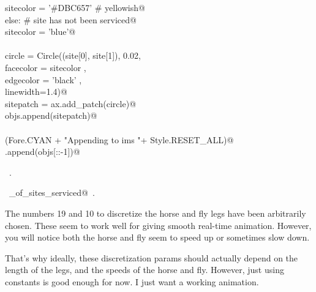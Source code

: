 \documentclass[11.5pt]{report}
\begin{document}
\begin{flushleft}
\begin{list}{}{}
\mbox{}\verb@        sitecolor = '#DBC657' # yellowish@\\
\mbox{}\verb@    else:                                  # site has not been serviced@\\
\mbox{}\verb@        sitecolor = 'blue'@\\
\mbox{}\verb@@\\
\mbox{}\verb@    circle = Circle((site[0], site[1]), 0.02, \@\\
\mbox{}\verb@                    facecolor = sitecolor   , \@\\
\mbox{}\verb@                    edgecolor = 'black'     , \@\\
\mbox{}\verb@                    linewidth=1.4)@\\
\mbox{}\verb@    sitepatch = ax.add_patch(circle)@\\
\mbox{}\verb@    objs.append(sitepatch)@\\
\mbox{}\verb@@\\
\mbox{}\verb@debug(Fore.CYAN + "Appending to ims "+ Style.RESET_ALL)@\\
\mbox{}\verb@ims.append(objs[::-1])@\\
\mbox{}\verb@@{\NWsep}
\end{list}
\vspace{-1.5ex}
\footnotesize
\begin{list}{}{\setlength{\itemsep}{-\parsep}\setlength{\itemindent}{-\leftmargin}}
\item \NWtxtMacroRefIn\ .
\item \NWtxtIdentsUsed\nobreak\  \verb@number_of_sites_serviced@\nobreak\ .
\item{}
\end{list}
\vspace{4ex}
\end{flushleft}


\vspace{-0.8cm} \newchunk \label{subsec-discretize-leg}
The numbers 19 and 10 to discretize the horse and fly legs have been 
arbitrarily chosen. These seem to work well for giving smooth real-time animation. 
However, you will notice  both the horse and fly seem to speed up or sometimes slow 
down. 

That's why ideally, these discretization params should actually depend on the length of the legs, and 
the speeds of the horse and fly. However, just using constants is good enough for now. I just 
want a working animation. 
\end{document}
